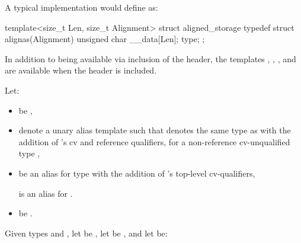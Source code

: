 %
\pnum
\begin{note}
A typical implementation would define  as:
\begin{codeblock}
template<size_t Len, size_t Alignment>
struct aligned_storage {
  typedef struct {
    alignas(Alignment) unsigned char __data[Len];
  } type;
};
\end{codeblock}
\end{note}

\pnum
In addition to being available via inclusion
of the  header, the templates
,
,
, and
are available
when the header  is included.

%
\pnum
Let:
\begin{itemize}
\item {} be
  ,
\item {} denote a unary alias template 
  such that  denotes the same type as  with the addition
  of 's cv and reference qualifiers, for a non-reference cv-unqualified
  type ,
\item {} be an alias for type 
  with the addition of 's top-level cv-qualifiers,
  \begin{example}
     is an alias for
    .
  \end{example}
\item {} be
  .
\end{itemize}
Given types  and ,
let  be ,
let  be , and
let  be:
